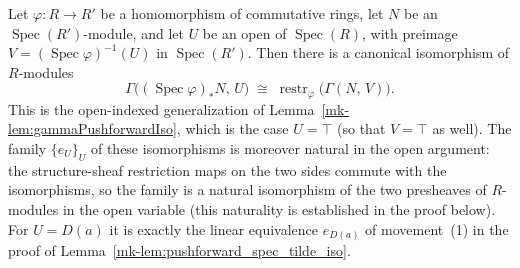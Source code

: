 \begin{lemma}\label{mk-lem:gammaPushforwardIsoAt}
  \leanok

  Let \(\varphi : R \to R'\) be a homomorphism of commutative rings, let \(N\) be
  an \(\operatorname{Spec}(R')\)-module, and let \(U\) be an open of
  \(\operatorname{Spec}(R)\), with preimage
  \(V = (\operatorname{Spec}\varphi)^{-1}(U)\) in \(\operatorname{Spec}(R')\). Then
  there is a canonical isomorphism of \(R\)-modules
  \[
    \Gamma\bigl((\operatorname{Spec}\varphi)_* N,\, U\bigr)
    \;\cong\;
    \operatorname{restr}_\varphi\bigl(\Gamma(N,\, V)\bigr) .
  \]
  This is the open-indexed generalization of
  Lemma~\ref{mk-lem:gammaPushforwardIso}, which is the case \(U = \top\) (so that
  \(V = \top\) as well). The family \(\{e_U\}_U\) of these isomorphisms is moreover
  natural in the open argument: the structure-sheaf restriction maps on the two
  sides commute with the isomorphisms, so the family is a natural isomorphism of the
  two presheaves of \(R\)-modules in the open variable (this naturality is
  established in the proof below). For \(U = D(a)\) it is exactly the linear
  equivalence \(e_{D(a)}\) of movement~(1) in the proof of
  Lemma~\ref{mk-lem:pushforward_spec_tilde_iso}.
\end{lemma}

